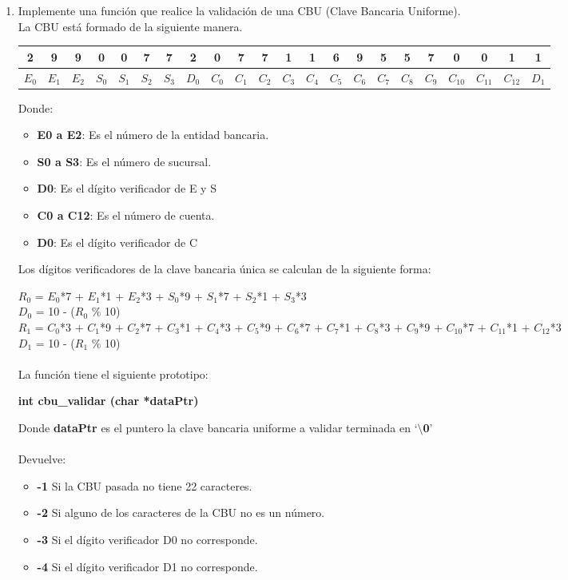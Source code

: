\documentclass[12pt]{article} %
\begin{document}
\begin{enumerate}
\item Implemente una función que realice la validación de una CBU (Clave Bancaria Uniforme).\\
La CBU está formado de la siguiente manera.\\
\fontsize{9pt}{9pt}\selectfont
\vspace{-0.6cm}
\begin{center} 
   \begin{tabular}{|c|c|c|c|c|c|c|c|c|c|c|c|c|c|c|c|c|c|c|c|c|c|}
    \hline 
     2&9&9&0&0&7&7&2&0&7&7&1&1&6&9&5&5&7&0&0&1&1 \\ \hline 
     $E_0$&$E_1$&$E_2$&$S_0$&$S_1$&$S_2$&$S_3$&$D_0$&$C_0$&$C_1$&$C_2$&$C_3$&$C_4$&$C_5$&$C_6$&
     $C_7$&$C_8$&$C_9$&$C_{10}$&$C_{11}$&$C_{12}$&$D_1$\\ \hline 
   \end{tabular}
\end{center}   	
\fontsize{12pt}{12pt}\selectfont
Donde:
\begin{itemize}
\item {\bf E0 a E2}: Es el número de la entidad bancaria.
\item {\bf S0 a S3}: Es el número de sucursal.
\item {\bf D0}: Es el dígito verificador de E y S
\item {\bf C0 a C12}: Es el número de cuenta.
\item {\bf D0}: Es el dígito verificador de C
\end{itemize}
Los dígitos verificadores de la clave bancaria única se calculan de la siguiente forma:\\
\fontsize{10.4pt}{10.4pt}\selectfont

$R_0$ = $E_0$*7 + $E_1$*1 + $E_2$*3 + $S_0$*9 + $S_1$*7 + $S_2$*1 + $S_3$*3 \\
$D_0$ = 10 - ($R_0$ \% 10)\\

$R_1$ = $C_0$*3 + $C_1$*9 + $C_2$*7 + $C_3$*1 + $C_4$*3 + $C_5$*9 + $C_6$*7 + $C_7$*1 + $C_8$*3 + $C_9$*9 + $C_{10}$*7 + $C_{11}$*1  + $C_{12}$*3\\
$D_1$ = 10 - ($R_1$ \% 10)\\
\fontsize{12pt}{12pt}\selectfont
\\
La función tiene el siguiente prototipo:
\begin{center}
{\bf int cbu\_validar (char *dataPtr)}
\end{center}
Donde {\bf dataPtr} es el puntero la clave bancaria uniforme a validar terminada en ‘{\bf $\setminus$0}’\\
\\
Devuelve:
\begin{itemize}
\item {\bf -1} Si la CBU pasada no tiene 22 caracteres.
\item {\bf -2} Si alguno de los caracteres de la CBU no es un número.
\item {\bf -3} Si el dígito verificador D0 no corresponde.
\item {\bf -4} Si el dígito verificador D1 no corresponde.
\end{itemize}
\end{enumerate}
 
\end{document}
